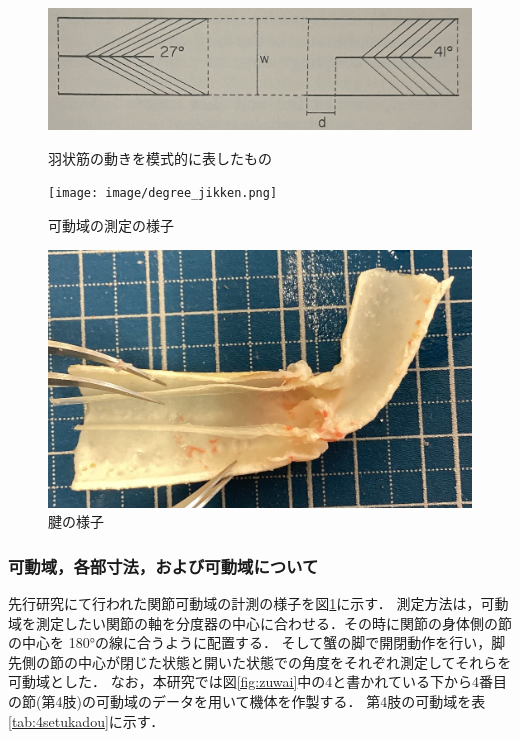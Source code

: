\begin{figure}[htbp]
  \begin{minipage}[b]{0.6\hsize}
    \centering
    \includegraphics[scale=0.18]{image/ujo.JPG}
    \vspace{5mm}
    \caption{羽状筋の動きを模式的に表したもの\cite{warner1977biology}}
    \label{fig:ujo}
  \end{minipage}
  \begin{minipage}[b]{0.39\hsize}
    \centering
    \texttt{[image: image/degree\_jikken.png]}
    \caption{可動域の測定の様子}
    \label{fig:sokutei}
  \end{minipage}
\end{figure}
\begin{figure}[htbp]
  \centering
  \includegraphics[scale=0.1]{image/setukanmaku.jpg}
  \caption{腱の様子\cite{hasegawa}}
  \label{fig:ken}
\end{figure}
\subsubsection{可動域，各部寸法，および可動域について}
先行研究\cite{hasegawa}にて行われた関節可動域の計測の様子を図\ref{fig:sokutei}に示す．
測定方法は，可動域を測定したい関節の軸を分度器の中心に合わせる．その時に関節の身体側の節の中心を 180°の線に合うように配置する．
そして蟹の脚で開閉動作を行い，脚先側の節の中心が閉じた状態と開いた状態での角度をそれぞれ測定してそれらを可動域とした．
なお，本研究では図\ref{fig:zuwai}中の4と書かれている下から4番目の節(第4肢)の可動域のデータを用いて機体を作製する．
第4肢の可動域を表\ref{tab:4setukadou}に示す．

